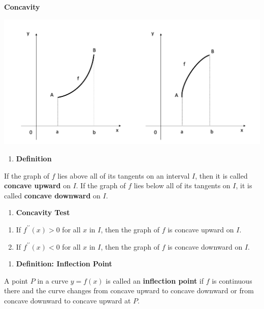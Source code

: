 \documentclass[]{book}
\providecommand{\tightlist}{%
  \setlength{\itemsep}{0pt}\setlength{\parskip}{0pt}}
\begin{document}
\textbf{Concavity}

\begin{center}\includegraphics[width=1\linewidth]{figure/5Derivatives-15} \end{center}

\begin{enumerate}
\def\labelenumi{\arabic{enumi}.}
\setcounter{enumi}{2}
\tightlist
\item
  \textbf{Definition}
\end{enumerate}

If the graph of \(f\) lies above all of its tangents on an interval \(I\), then it is called \textbf{concave upward} on \(I\). If the graph of \(f\) lies below all of its tangents on \(I\), it is called \textbf{concave downward} on \(I\).

\begin{enumerate}
\def\labelenumi{\arabic{enumi}.}
\setcounter{enumi}{3}
\tightlist
\item
  \textbf{Concavity Test}
\end{enumerate}

\begin{enumerate}
\def\labelenumi{(\alph{enumi})}
\item
  If \(f^{\prime \prime}(x)>0\) for all \(x\) in \(I\), then the graph of \(f\) is concave upward on \(I\).
\item
  If \(f^{\prime \prime}(x)<0\) for all \(x\) in \(I\), then the graph of \(f\) is concave downward on \(I\).
\end{enumerate}

\begin{enumerate}
\def\labelenumi{\arabic{enumi}.}
\setcounter{enumi}{4}
\tightlist
\item
  \textbf{Definition: Inflection Point}
\end{enumerate}

A point \(P\) in a curve \(y=f(x)\) is called an \textbf{inflection point} if \(f\) is continuous there and the curve changes from concave upward to concave downward or from concave downward to concave upward at \(P\).
\end{document}
